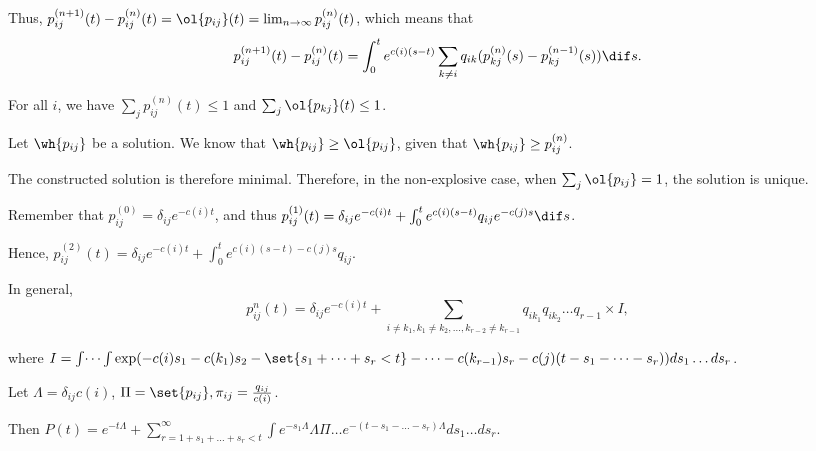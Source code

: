 \documentclass[11pt]{scrartcl}
\begin{document}
  Thus,
  $p_{ij}^{(n+1)}(t) - p_{ij}^{(n)}(t) = \ol{p_{ij}}(t) = \lim_{n\to
    \infty}p_{ij}^{(n)}(t)$, which means that
  \begin{equation*}
    p_{ij}^{(n+1)}(t) - p_{ij}^{(n)}(t) = \int_{0}^{t}e^{c(i)(s-t)}\sum_{k\neq i}q_{ik}(p_{kj}^{(n)}(s) - p_{kj}^{(n-1)}(s)) \dif s.
  \end{equation*}

  For all $i$, we have $\sum_{j}p_{ij}^{(n)}(t) \leq 1$ and
  $\sum_{j}\ol{p_{kj}}(t) \leq 1$.

  Let $\wh{p_{ij}}$ be a solution. We know that
  $\wh{p_{ij}} \geq \ol{p_{ij}}$, given that
  $\wh{p_{ij}} \geq p_{ij}^{(n)}$.

  The constructed solution is therefore minimal. Therefore, in the
  non-explosive case, when $\sum_{j}\ol{p_{ij}} = 1$, the solution is
  unique.

  Remember that $p_{ij}^{(0)} = \delta_{ij}e^{-c(i)t}$, and thus
  $p_{ij}^{(1)}(t) = \delta_{ij}e^{-c(i)t} + \int_{0}^{t}
  e^{c(i)(s-t)}q_{ij}e^{-c(j)s}\dif s$.

  Hence, $p_{ij}^{(2)}(t) = \delta_{ij}e^{-c(i)t} + \int_{0}^{t} e^{c(i)(s-t)-c(j)s}q_{ij}$.

  In general, 
  \begin{equation*}
    p_{ij}^{n}(t) = \delta_{ij}e^{-c(i)t} + \sum_{i\neq k_{1}, k_{1}\neq k_{2}, \dots, k_{r-2} \neq k_{r-1} }q_{ik_{1}}q_{ik_{2}}\dots q_{r-1}\times I,
  \end{equation*}

  where
  $I = \int \dots \int \exp(- c(i)s_{1} - c(k_{1}) s_{2} -
  \set{s_{1}+\dots+s_{r} <t} - \dots - c(k_{r-1})s_{r} - c(j)(t- s_{1}
  - \dots - s_{r})) ds_{1}\dots ds_{r}$.

  Let $\Lambda = \delta_{ij}c(i)$, $\Pi = \set{p_{ij}}, \pi_{ij} = \frac{q_{ij}}{c(i)}$.

  Then
  $P(t) = e^{-t\Lambda} + \sum_{r = 1+ s_{1}+\dots +s_{r} <
    t}^{\infty}\int e^{-s_{1}\Lambda}\Lambda\Pi \dots e^{-(t - s_{1} -
    \dots - s_{r})\Lambda}ds_{1}\dots ds_{r}$.

  

  
\end{document}
